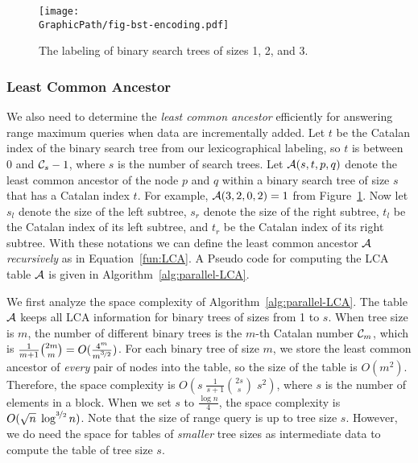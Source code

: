 \begin{figure}[!thb]
  \centering
  \texttt{[image: \\GraphicPath/fig-bst-encoding.pdf]}
  \caption{The labeling of binary search trees of sizes 1, 2, and 3.}
  \label{fig:labelingBST}
\end{figure}

\subsubsection{Least Common Ancestor}

We also need to determine the {\em least common ancestor} efficiently
for answering range maximum queries when data are incrementally added.
Let $t$ be the Catalan index of the binary search tree from our
lexicographical labeling, so $t$ is between $0$ and ${\cal C}_s-1$, where
$s$ is the number of search trees.  Let ${\cal A}(s, t, p, q)$ denote
the least common ancestor of the node $p$ and $q$ within a binary search
tree of size $s$ that has a Catalan index $t$.  For example, ${\cal
A}(3, 2, 0, 2) = 1$ from Figure~\ref{fig:labelingBST}.  Now let $s_l$
denote the size of the left subtree, $s_r$ denote the size of the right
subtree, $t_l$ be the Catalan index of its left subtree, and $t_r$ be
the Catalan index of its right subtree.  With these notations we can
define the least common ancestor $\cal A$ {\em recursively} as in
Equation~\ref{fun:LCA}.  A Pseudo code for computing the LCA table $\cal
A$ is given in Algorithm~\ref{alg:parallel-LCA}.





We first analyze the space complexity of
Algorithm~\ref{alg:parallel-LCA}.  The table $\cal A$ keeps all LCA
information for binary trees of sizes from 1 to $s$.  When tree size is
$m$, the number of different binary trees is the $m$-th Catalan number
${\cal C}_m$, which is
$\frac{1}{m+1}\binom{2m}{m}=O(\frac{4^m}{m^{\nicefrac{3}{2}}})$. For
each binary tree of size $m$, we store the least common ancestor of {\em
every} pair of nodes into the table, so the size of the table is
$O(m^2)$. Therefore, the space complexity is $O(s \;
\frac{1}{s+1}\binom{2s}{s} \; s^2)$, where $s$ is the number of elements
in a block.  When we set $s$ to $\frac{\log n}{4}$, the space complexity
is $O(\sqrt{n} \;
\log^{\nicefrac{3}{2}} n)$.  Note that the size of range query is up to
tree size $s$.  However, we do need the space for tables of {\em
smaller} tree sizes as intermediate data to compute the table of tree
size $s$.

